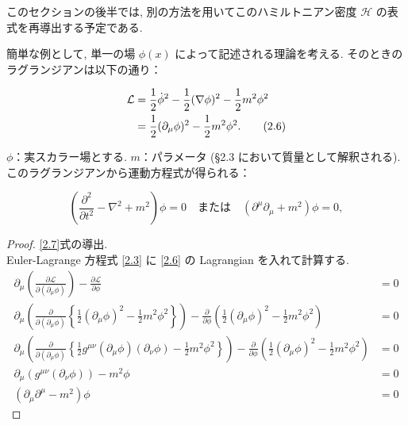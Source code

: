 \documentclass[a4paper,12pt]{article}
\begin{document}
このセクションの後半では, 別の方法を用いてこのハミルトニアン密度 $\mathcal{H}$ の表式を再導出する予定である.

簡単な例として, 単一の場 $\phi(x)$ によって記述される理論を考える. そのときのラグランジアンは以下の通り：

\begin{align}\label{2.6}
    \mathcal{L} &= \frac{1}{2} \dot{\phi}^2 - \frac{1}{2} (\nabla \phi)^2 - \frac{1}{2} m^2 \phi^2 \notag \\
    &= \frac{1}{2} (\partial_\mu \phi)^2 - \frac{1}{2} m^2 \phi^2. \tag{2.6}
\end{align}

$\phi$：実スカラー場とする. $m$：パラメータ (§2.3 において質量として解釈される).\\
このラグランジアンから運動方程式が得られる：

\begin{equation*}\label{2.7}
\left( \frac{\partial^2}{\partial t^2} - \nabla^2 + m^2 \right) \phi = 0
\quad \text{または} \quad
\left( \partial^\mu \partial_\mu + m^2 \right) \phi = 0, \tag{2.7}
\end{equation*}

\color{blue}

\begin{proof}
\eqref{2.7}式の導出.\\
Euler-Lagrange 方程式 \eqref{2.3} に \eqref{2.6} の Lagrangian を入れて計算する.
\begin{align*}
    \partial_\mu \left( \frac{\partial \mathcal{L}}{\partial (\partial_\mu \phi)} \right) - \frac{\partial \mathcal{L}}{\partial \phi} &= 0 \tag{2-2.b1}\\
    \partial_\mu \left( \frac{\partial}{\partial (\partial_\mu \phi)} \left\{ \frac{1}{2} (\partial_\mu \phi)^2 - \frac{1}{2} m^2 \phi^2 \right\} \right) - \frac{\partial}{\partial \phi} \left( \frac{1}{2} (\partial_\mu \phi)^2 - \frac{1}{2} m^2 \phi^2 \right) &= 0 \tag{2-2.b2}\\
    \partial_\mu \left( \frac{\partial}{\partial (\partial_\mu \phi)} \left\{ \frac{1}{2} g^{\mu\nu}(\partial_\mu \phi)(\partial_\nu \phi) - \frac{1}{2} m^2 \phi^2 \right\} \right) - \frac{\partial}{\partial \phi} \left( \frac{1}{2} (\partial_\mu \phi)^2 - \frac{1}{2} m^2 \phi^2 \right) &= 0 \tag{2-2.b2}\\
    \partial_\mu \left( g^{\mu\nu}(\partial_\nu \phi) \right) - m^2 \phi &= 0 \tag{2-2.b3}\\
    (\partial_\mu \partial^\mu -m^2) \phi &= 0 \tag{2-2.b4}
\end{align*}

\end{proof}
\end{document}

